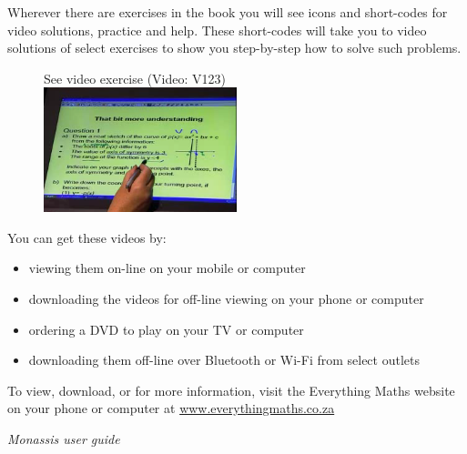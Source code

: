 {\Large

Wherever there are exercises in the book you will see icons and short-codes for video solutions,
practice and help. These short-codes will take you to video solutions of select exercises to show you
step-by-step how to solve such problems. \par

\begin{figure}[h]
\begin{center}
See video exercise  (Video: V123)\\ 
\includegraphics[width=0.5\textwidth]{../title_images/mindsetexercise.png}
\end{center}
\end{figure}
You can get these videos by:
\begin{itemize}[noitemsep]
    \item viewing them on-line on your mobile or computer
    \item downloading the videos for off-line viewing on your phone or computer
    \item ordering a DVD to play on your TV or computer
    \item downloading them off-line over Bluetooth or Wi-Fi from select outlets
\end{itemize}


To view, download, or for more information, visit the Everything Maths website on your phone or
computer at \underline{www.everythingmaths.co.za}  \par
\vspace*{1cm}
}



{\normalfont\sffamily\fontsize{22}\normalfont\itshape Monassis user guide} \par

